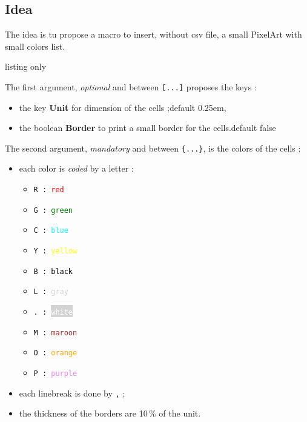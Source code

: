 \documentclass{article}
\newcommand\Cle[1]{{\bfseries\sffamily\textlangle #1\textrangle}}
\begin{document}
\subsection{Idea}

The idea is tu propose a macro to insert, without \textsf{csv} file, a small PixelArt with small colors list.

\begin{PresentationCode}{listing only}
\end{PresentationCode}

The first argument, \textit{optional} and between \texttt{[...]} proposes the \textsf{keys }:

\begin{itemize}
	\item the key \Cle{Unit} for dimension of the cells ;\hfill{}default \textsf{0.25em},
	\item the boolean \Cle{Border} to print a small border for the cells.\hfill{}default \textsf{false}
\end{itemize}

The second argument, \textit{mandatory} and between \texttt{\{...\}}, is the colors of the cells :

\begin{itemize}
	\item each color is \textit{coded} by a letter :
	\begin{multicols}{5}
		\begin{itemize}
			\item \texttt{R : \textcolor{red}{red}}
			\item \texttt{G : \textcolor{green}{green}}
			\item \texttt{C : \textcolor{cyan}{blue}}
			\item \texttt{Y : \textcolor{yellow}{yellow}}
			\item \texttt{B : \textcolor{black}{black}}
			\item \texttt{L : \textcolor{lightgray}{gray}}
			\item \texttt{. : \colorbox{lightgray}{\textcolor{white}{white}}}
			\item \texttt{M : \textcolor{brown}{maroon}}
			\item \texttt{O : \textcolor{orange}{orange}}
			\item \texttt{P : \textcolor{violet}{purple}}
		\end{itemize}
	\end{multicols}
	\item each linebreak is done by \texttt{,} ;
	\item the thickness of the borders are 10\,\% of the unit.
\end{itemize}
\end{document}
